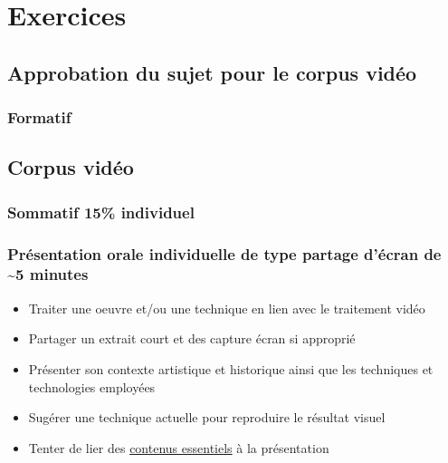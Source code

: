 \documentclass[
]{book}
\providecommand{\tightlist}{%
  \setlength{\itemsep}{0pt}\setlength{\parskip}{0pt}}
\begin{document}
\hypertarget{exercices}{%
\chapter{Exercices}\label{exercices}}

\hypertarget{formatif_1}{%
\section{Approbation du sujet pour le corpus vidéo}\label{formatif_1}}

\hypertarget{formatif}{%
\subsection{Formatif}\label{formatif}}

\hypertarget{sommatif_1}{%
\section{Corpus vidéo}\label{sommatif_1}}

\hypertarget{sommatif-15-individuel}{%
\subsection{Sommatif 15\% individuel}\label{sommatif-15-individuel}}

\hypertarget{pruxe9sentation-orale-individuelle-de-type-partage-duxe9cran-de-5-minutes}{%
\subsection{Présentation orale individuelle de type partage d'écran de \textasciitilde5 minutes}\label{pruxe9sentation-orale-individuelle-de-type-partage-duxe9cran-de-5-minutes}}

\begin{itemize}
\tightlist
\item
  Traiter une oeuvre et/ou une technique en lien avec le traitement vidéo\\
\item
  Partager un extrait court et des capture écran si approprié
\item
  Présenter son contexte artistique et historique ainsi que les techniques et technologies employées
\item
  Sugérer une technique actuelle pour reproduire le résultat visuel
\item
  Tenter de lier des \protect\hyperlink{contenus_essentiels}{contenus essentiels} à la présentation
\end{itemize}
\end{document}
